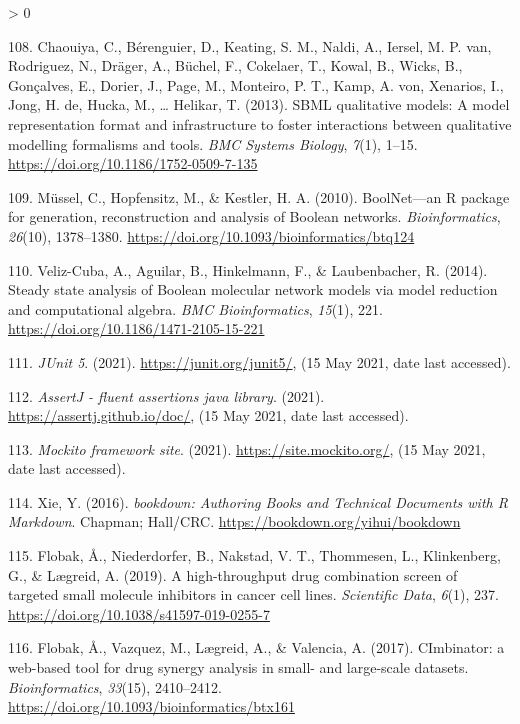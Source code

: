 \documentclass[
  12pt,
]{book}
\newlength{\cslhangindent}
\newenvironment{CSLReferences}[2] %
 {%
  \setlength{\parindent}{0pt}
  \ifodd #1 \everypar{\setlength{\hangindent}{\cslhangindent}}\ignorespaces\fi
  \ifnum #2 > 0
  \setlength{\parskip}{#2\baselineskip}
  \fi
 }%
 {}
\begin{document}
\begin{CSLReferences}{1}{0}
\leavevmode\hypertarget{ref-Chaouiya2013}{}%
108. Chaouiya, C., Bérenguier, D., Keating, S. M., Naldi, A., Iersel, M. P. van, Rodriguez, N., Dräger, A., Büchel, F., Cokelaer, T., Kowal, B., Wicks, B., Gonçalves, E., Dorier, J., Page, M., Monteiro, P. T., Kamp, A. von, Xenarios, I., Jong, H. de, Hucka, M., \ldots{} Helikar, T. (2013). {SBML qualitative models: A model representation format and infrastructure to foster interactions between qualitative modelling formalisms and tools}. \emph{BMC Systems Biology}, \emph{7}(1), 1--15. \url{https://doi.org/10.1186/1752-0509-7-135}

\leavevmode\hypertarget{ref-Mussel2010}{}%
109. Müssel, C., Hopfensitz, M., \& Kestler, H. A. (2010). {BoolNet---an R package for generation, reconstruction and analysis of Boolean networks}. \emph{Bioinformatics}, \emph{26}(10), 1378--1380. \url{https://doi.org/10.1093/bioinformatics/btq124}

\leavevmode\hypertarget{ref-Veliz-Cuba2014}{}%
110. Veliz-Cuba, A., Aguilar, B., Hinkelmann, F., \& Laubenbacher, R. (2014). {Steady state analysis of Boolean molecular network models via model reduction and computational algebra}. \emph{BMC Bioinformatics}, \emph{15}(1), 221. \url{https://doi.org/10.1186/1471-2105-15-221}

\leavevmode\hypertarget{ref-JUnit5}{}%
111. \emph{{JUnit 5}}. (2021). \url{https://junit.org/junit5/}, (15 May 2021, date last accessed).

\leavevmode\hypertarget{ref-AssertJ}{}%
112. \emph{{AssertJ - fluent assertions java library}}. (2021). \url{https://assertj.github.io/doc/}, (15 May 2021, date last accessed).

\leavevmode\hypertarget{ref-Mockito-site}{}%
113. \emph{{Mockito framework site}}. (2021). \url{https://site.mockito.org/}, (15 May 2021, date last accessed).

\leavevmode\hypertarget{ref-Xie2016}{}%
114. Xie, Y. (2016). \emph{{bookdown: Authoring Books and Technical Documents with R Markdown}}. Chapman; Hall/CRC. \url{https://bookdown.org/yihui/bookdown}

\leavevmode\hypertarget{ref-Flobak2019}{}%
115. Flobak, Å., Niederdorfer, B., Nakstad, V. T., Thommesen, L., Klinkenberg, G., \& Lægreid, A. (2019). {A high-throughput drug combination screen of targeted small molecule inhibitors in cancer cell lines}. \emph{Scientific Data}, \emph{6}(1), 237. \url{https://doi.org/10.1038/s41597-019-0255-7}

\leavevmode\hypertarget{ref-Flobak2017}{}%
116. Flobak, Å., Vazquez, M., Lægreid, A., \& Valencia, A. (2017). {CImbinator: a web-based tool for drug synergy analysis in small- and large-scale datasets}. \emph{Bioinformatics}, \emph{33}(15), 2410--2412. \url{https://doi.org/10.1093/bioinformatics/btx161}


\end{CSLReferences}
\end{document}
